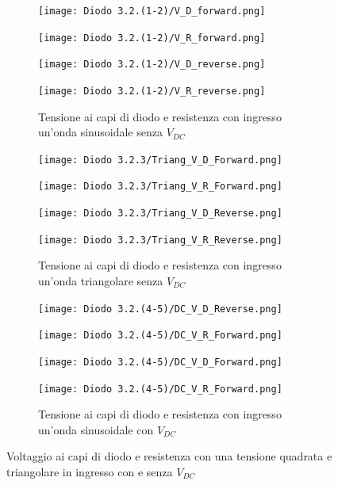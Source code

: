 \begin{figure}[h!]
	\begin{subfigure}{1\textwidth}
		\begin{minipage}{0.24\textwidth}
			\texttt{[image: Diodo 3.2.(1-2)/V\_D\_forward.png]}
		\end{minipage}
		\hfill
		\begin{minipage}{0.24\textwidth}
			\texttt{[image: Diodo 3.2.(1-2)/V\_R\_forward.png]}
		\end{minipage}
		\hfill
		\begin{minipage}{0.24\textwidth}
			\texttt{[image: Diodo 3.2.(1-2)/V\_D\_reverse.png]}
		\end{minipage}
		\hfill
		\begin{minipage}{0.24\textwidth}
			\texttt{[image: Diodo 3.2.(1-2)/V\_R\_reverse.png]}
		\end{minipage}
		\caption{Tensione ai capi di diodo e resistenza con ingresso un'onda sinusoidale senza $V_{DC}$}
		\label{SS}
	\end{subfigure}
	\hfill
	\begin{subfigure}{1\textwidth}
		\begin{minipage}{0.24\textwidth}
			\texttt{[image: Diodo 3.2.3/Triang\_V\_D\_Forward.png]}
		\end{minipage}
		\hfill
		\begin{minipage}{0.24\textwidth}
			\texttt{[image: Diodo 3.2.3/Triang\_V\_R\_Forward.png]}
		\end{minipage}
		\begin{minipage}{0.24\textwidth}
			\texttt{[image: Diodo 3.2.3/Triang\_V\_D\_Reverse.png]}
		\end{minipage}
		\hfill
		\begin{minipage}{0.24\textwidth}
			\texttt{[image: Diodo 3.2.3/Triang\_V\_R\_Reverse.png]}
		\end{minipage}
		\caption{Tensione ai capi di diodo e resistenza con ingresso un'onda triangolare senza $V_{DC}$}
		\label{TS}
	\end{subfigure}
	\hfill
	\begin{subfigure}{1\textwidth}
		\begin{minipage}{0.24\textwidth}
			\texttt{[image: Diodo 3.2.(4-5)/DC\_V\_D\_Reverse.png]}
		\end{minipage}
		\hfill
		\begin{minipage}{0.24\textwidth}
			\texttt{[image: Diodo 3.2.(4-5)/DC\_V\_R\_Forward.png]}
		\end{minipage}
		\begin{minipage}{0.24\textwidth}
			\centering
			\texttt{[image: Diodo 3.2.(4-5)/DC\_V\_D\_Forward.png]}
		\end{minipage}
		\hfill
		\begin{minipage}{0.24\textwidth}
			\centering
			\texttt{[image: Diodo 3.2.(4-5)/DC\_V\_R\_Forward.png]}
		\end{minipage}
		\caption{Tensione ai capi di diodo e resistenza con ingresso un'onda sinusoidale con $V_{DC}$}
		\label{SC}
	\end{subfigure}
	\caption{Voltaggio ai capi di diodo e resistenza con una tensione quadrata e triangolare in ingresso con e senza $V_{DC}$}
	\label{Triangular input}
\end{figure}

